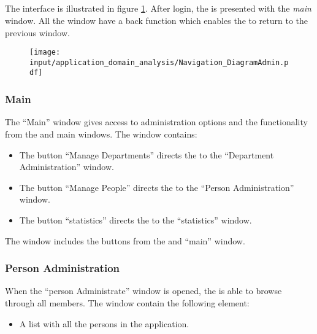 \subsection{\ainterface}
\label{sec:admininterface}
The \admin[] interface is illustrated in figure \ref{fig:admin_interface}.
After login, the \admin[] is presented with the \textit{main} window. All the window have a back function which enables the \admin[] to return to the previous window.


\begin{figure}[p]
	\centering
		\texttt{[image: input/application\_domain\_analysis/Navigation\_DiagramAdmin.pdf]}
	\label{fig:admin_interface} %
\end{figure}

\subsubsection{Main}
The ``Main'' \admin[] window gives access to administration options and the functionality from the \astaff[] and \aclient[] main windows. The window contains: 
\begin{itemize}
	\item The button ``Manage Departments'' directs the \admin[] to the ``Department Administration'' window.  
	\item The button ``Manage People'' directs the \admin[] to the ``Person Administration'' window.
	\item The button ``statistics'' directs the \admin[] to the ``statistics'' window.
\end{itemize}
The window includes the buttons from the \astaff[] and \aclient[] ``main'' window.

\subsubsection{Person Administration}
When the ``person Administrate'' window is opened, the \admin[] is able to browse through all \astaff[] members. The window contain the following element:
\begin{itemize}
	\item A list with all the persons in the application.
\end{itemize}

